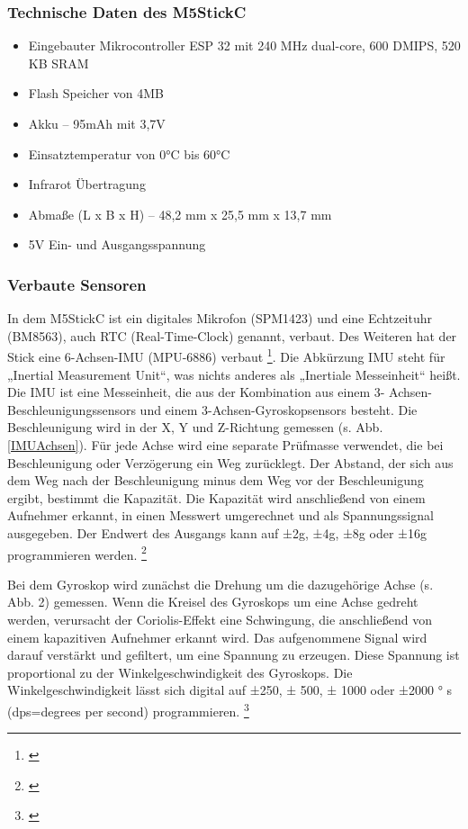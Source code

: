 \documentclass[a4paper,12pt]{article}
\begin{document}
\subsubsection{Technische Daten des M5StickC}
\begin{itemize}
\item Eingebauter Mikrocontroller ESP 32 mit 240 MHz dual-core, 600 DMIPS, 520 KB SRAM
\item Flash Speicher von 4MB
\item Akku – 95mAh mit 3,7V
\item Einsatztemperatur von 0°C bis 60°C
\item Infrarot Übertragung
\item Abmaße (L x B x H) – 48,2 mm x 25,5 mm x 13,7 mm
\item 5V Ein- und Ausgangsspannung
\end{itemize}

\subsubsection{Verbaute Sensoren}
In dem M5StickC ist ein digitales Mikrofon (SPM1423) und eine Echtzeituhr (BM8563), auch RTC
(Real-Time-Clock) genannt, verbaut. Des Weiteren hat der Stick eine 6-Achsen-IMU (MPU-6886)
verbaut \footnote{\cite{M5STACK.}}. Die Abkürzung IMU steht für „Inertial Measurement Unit“, was nichts anderes als
„Inertiale Messeinheit“ heißt. Die IMU ist eine Messeinheit, die aus der Kombination aus einem 3-
Achsen- Beschleunigungssensors und einem 3-Achsen-Gyroskopsensors besteht. Die Beschleunigung
wird in der X, Y und Z-Richtung gemessen (s. Abb. \ref{IMUAchsen}). Für jede Achse wird eine separate Prüfmasse
verwendet, die bei Beschleunigung oder Verzögerung ein Weg zurücklegt. Der Abstand, der sich aus
dem Weg nach der Beschleunigung minus dem Weg vor der Beschleunigung ergibt, bestimmt die
Kapazität. Die Kapazität wird anschließend von einem Aufnehmer erkannt, in einen Messwert
umgerechnet und als Spannungssignal ausgegeben. Der Endwert des Ausgangs kann auf ±2g, ±4g,
±8g oder ±16g programmieren werden. \footnote{\cite{InvenSense.}}

Bei dem Gyroskop wird zunächst die Drehung um die dazugehörige Achse (s. Abb. 2) gemessen.
Wenn die Kreisel des Gyroskops um eine Achse gedreht werden, verursacht der Coriolis-Effekt eine
Schwingung, die anschließend von einem kapazitiven Aufnehmer erkannt wird. Das aufgenommene
Signal wird darauf verstärkt und gefiltert, um eine Spannung zu erzeugen. Diese Spannung ist
proportional zu der Winkelgeschwindigkeit des Gyroskops. Die Winkelgeschwindigkeit lässt sich
digital auf ±250, ± 500, ± 1000 oder ±2000 °
s
(dps=degrees per second) programmieren. \footnote{\cite{InvenSense.}}
\end{document}
